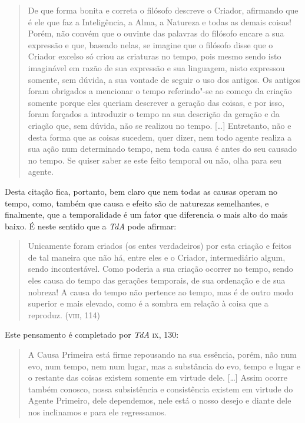 \begin{quote}
De que forma bonita e correta o filósofo descreve o Criador,
afirmando que é ele que faz a Inteligência, a Alma, a Natureza e
todas as demais coisas! Porém, não convém que o ouvinte das
palavras do filósofo encare a sua expressão e que, baseado
nelas, se imagine que o filósofo disse que o Criador excelso só
criou as criaturas no tempo, pois mesmo sendo isto imaginável em
razão de sua expressão e sua linguagem, nisto expressou somente,
sem dúvida, a sua vontade de seguir o uso dos antigos. Os
antigos foram obrigados a mencionar o tempo referindo"-se ao
começo da criação somente porque eles queriam descrever a
geração das coisas, e por isso, foram forçados a introduzir o
tempo na sua descrição da geração e da criação que, sem dúvida,
não se realizou no tempo. [\ldots{}] Entretanto, não e desta forma
que as coisas sucedem, quer dizer, nem todo agente realiza a sua
ação num determinado tempo, nem toda causa é antes do seu
causado no tempo. Se quiser saber se este feito temporal ou 
não, olha para seu agente.
\end{quote}

Desta citação fica, portanto, bem claro que nem todas as causas
operam no tempo, como, também que causa e efeito são de
naturezas semelhantes, e finalmente, que a temporalidade é um
fator que diferencia o mais alto do mais baixo.  É neste sentido
que a \emph{TdA} pode afirmar:

\begin{quote}
Unicamente foram criados (os entes verdadeiros) por esta criação
e feitos de tal maneira que não há, entre eles e o Criador,
intermediário algum, sendo incontestável. Como poderia a sua
criação ocorrer no tempo, sendo eles causa do tempo das gerações
temporais, de sua ordenação e de sua nobreza! A causa do tempo
não pertence ao tempo, mas é de outro modo superior e mais
elevado, como é a sombra em relação à coisa que a reproduz.
(\textsc{viii}, 114)
\end{quote}

Este pensamento é completado por \emph{TdA} \textsc{ix}, 130: 

\begin{quote}
A Causa Primeira está firme repousando na sua essência, porém,
não num evo, num tempo, nem num lugar, mas a substância do evo,
tempo e lugar e o restante das coisas existem somente em virtude
dele. [\ldots{}] Assim ocorre também conosco, nossa subsistência e
consistência existem em virtude do Agente Primeiro, dele
dependemos, nele está o nosso desejo e diante dele nos
inclinamos e para ele regressamos.
\end{quote}

